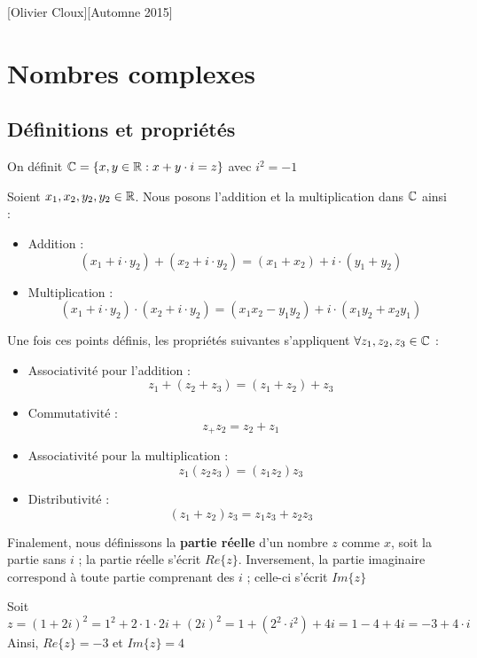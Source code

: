 \documentclass[12pt,a4paper]{article}
\begin{document}
[Olivier Cloux][Automne 2015]
\newpage
\tableofcontents
{}
\newcommand{\dive}{\text{ div }}
\newcommand{\rot}{\text{ rot }}
\newcommand{\grad}{\text{ grad }}
\section{Nombres complexes}
\subsection{Définitions et propriétés}
\begin{boite}[0.7]
	\centering
	On définit $\mathbb{C} = \{x,y \in \mathbb{R} : x + y\cdot i = z\}$ avec $i^2 = -1$
\end{boite}
Soient $x_1,x_2,y_2,y_2 \in \mathbb{R}$. Nous posons l'addition et la multiplication dans $\mathbb{C}$ ainsi :
\begin{itemize}
	\item 	Addition :
			\begin{equation}
				(x_1 + i\cdot y_2) + (x_2 + i \cdot y_2) = (x_1+x_2) + i\cdot(y_1+y_2)
			\end{equation}
	\item 	Multiplication : 
			\begin{equation}
				(x_1 + i\cdot y_2) \cdot (x_2 + i \cdot y_2) = (x_1x_2-y_1y_2) + i\cdot(x_1y_2 + x_2y_1)
			\end{equation}
\end{itemize}
Une fois ces points définis, les propriétés suivantes s'appliquent $\forall z_1,z_2,z_3 \in \mathbb{C}$ :
\begin{itemize}
	\item 	Associativité pour l'addition :
			\begin{equation}
				z_1 + (z_2 + z_3) = (z_1+z_2) + z_3
			\end{equation}
	\item 	Commutativité :
			\begin{equation}
				z_+ z_2 = z_2 + z_1
			\end{equation}
	\item	Associativité pour la multiplication :
			\begin{equation}
				z_1(z_2z_3) = (z_1z_2)z_3
			\end{equation}
	\item 	Distributivité :
			\begin{equation}
				(z_1 + z_2)z_3 = z_1z_3 + z_2z_3
			\end{equation}
\end{itemize}
Finalement, nous définissons la \textbf{partie réelle} d'un nombre $z$ comme $x$, soit la partie sans $i$ ; la partie réelle s'écrit $Re\{z\}$. Inversement, la partie imaginaire correspond à toute partie comprenant des $i$ ; celle-ci s'écrit $Im\{z\}$
\begin{exemple}[0.85]
	Soit 
	\[z = (1+2i)^2 = 1^2 + 2\cdot 1 \cdot 2i + (2i)^2 = 1 + (2^2 \cdot i^2) + 4i = 1 - 4 + 4i = -3 + 4\cdot i\]
	Ainsi, $Re\{z\} = -3$ et $Im\{z\} = 4$
\end{exemple}
\end{document}

